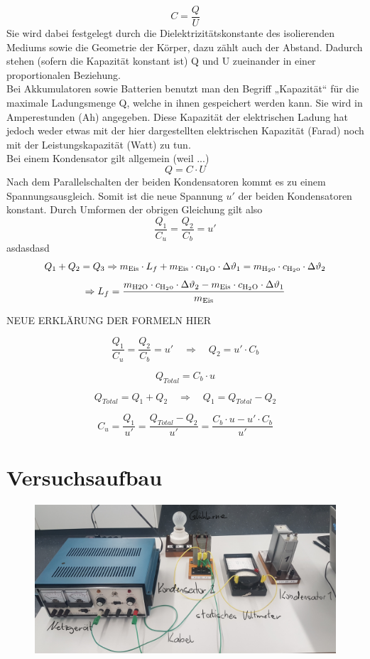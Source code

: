 \documentclass[a4paper,12pt]{article}
\begin{document}
$$C=\frac{Q}{U}$$
Sie wird dabei festgelegt durch die Dielektrizitätskonstante des isolierenden Mediums sowie die Geometrie der Körper, dazu zählt auch der Abstand. Dadurch stehen (sofern die Kapazität konstant ist) Q und U zueinander in einer proportionalen Beziehung.\\

Bei Akkumulatoren sowie Batterien benutzt man den Begriff „Kapazität“ für die maximale Ladungsmenge Q, welche in ihnen gespeichert werden kann. Sie wird in Amperestunden (Ah) angegeben. Diese Kapazität der elektrischen Ladung hat jedoch weder etwas mit der hier dargestellten elektrischen Kapazität (Farad) noch mit der Leistungskapazität (Watt) zu tun.\\

Bei einem Kondensator gilt allgemein (weil ...)
$$Q=C\cdot U$$
Nach dem Parallelschalten der beiden Kondensatoren kommt es zu einem Spannungsausgleich. Somit ist die neue Spannung $u'$ der beiden Kondensatoren konstant. Durch Umformen der obrigen Gleichung gilt also
$$\frac{Q_1}{C_u} = \frac{Q_2}{C_b} = u'$$
asdasdasd
$$ Q_{1} + Q_{2} = Q_{3} \Rightarrow m_{\rm{Eis}} \cdot L_f + m_{\rm{Eis}} \cdot c_{\rm{H_2O}} \cdot \Delta\vartheta_1 = m_{\rm{H_2o}} \cdot c_{\rm{H_2o}} \cdot \Delta\vartheta_2$$ $$ \Rightarrow L_f = \frac{m_{\rm{H2O}} \cdot c_{\rm{H_2o}} \cdot \Delta\vartheta_2 - m_{\rm{Eis}} \cdot c_{\rm{H_2O}} \cdot \Delta\vartheta_1}{m_{\rm{Eis}}}$$

NEUE ERKLÄRUNG DER FORMELN HIER
\newpage

$$\frac{Q_1}{C_u} = \frac{Q_2}{C_b} = u'\quad \Rightarrow \quad Q_2 = u' \cdot C_b$$

$$Q_{Total} = C_b \cdot u$$

$$Q_{Total} = Q_1+Q_2 \quad \Rightarrow \quad Q_1=Q_{Total}-Q_2$$

$$C_u = \frac{Q_1}{u'} = \frac{Q_{Total}-Q_2}{u'} = \frac{C_b \cdot u - u' \cdot C_b}{u'}$$

\section{Versuchsaufbau}
\begin{figure}[H]

\centering
\includegraphics[width=.8\textwidth]{media/bennenung.png}

\end{figure}
\end{document}
